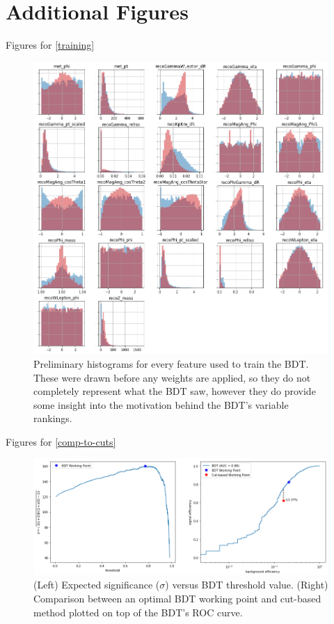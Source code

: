 \chapter{Additional Figures}

\begin{section}{Figures for \ref{training}}

\begin{figure}[htb]
\begin{center}
\includegraphics[width=.55\linewidth]{Dissertation/fig/bdt-training.png}
\end{center}
\caption{Preliminary histograms for every feature used to train the BDT. These were drawn before any weights are applied, so they do not completely represent what the BDT saw, however they do provide some insight into the motivation behind the BDT's variable rankings.}
\label{fig:bdt-training}
\end{figure}

\end{section}

\begin{section}{Figures for \ref{comp-to-cuts}}

\begin{figure}[htb]
\begin{center}
\includegraphics[width=.95\linewidth]{Dissertation/fig/bdt-vs-cuts.png}
\end{center}
\caption{(Left) Expected significance ($\sigma$) versus BDT threshold value. (Right) Comparison between an optimal BDT working point and cut-based method plotted on top of the BDT's ROC curve.}
\label{fig:bdt-vs-cuts}
\end{figure}

\end{section}

